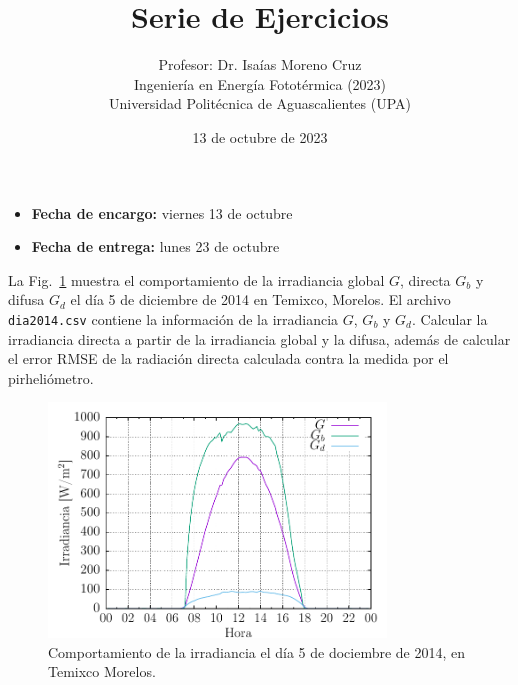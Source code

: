 \documentclass[spanish, letterpaper,12]{article}
\newenvironment{problem}[2][Problema]{\begin{trivlist}
\item[\hskip \labelsep {\bfseries #1}\hskip \labelsep {\bfseries #2.}]}{\end{trivlist}}
\begin{document}
 
\title{Serie de Ejercicios}
\author{Profesor: Dr. Isaías Moreno Cruz\\
  Ingeniería en Energía Fototérmica (2023)\\
Universidad Politécnica de Aguascalientes (UPA)}
\date{13 de octubre de 2023}

\maketitle

\begin{itemize}[leftmargin=*, noitemsep]
\item \textbf{Fecha de encargo:} viernes 13 de octubre
\item \textbf{Fecha de entrega:} lunes 23 de octubre
\end{itemize}
\thispagestyle{fancy}

\begin{problem}{1}

  La Fig.~\ref{fig:dia2014} muestra el comportamiento de la irradiancia global $G$, directa $G_{b}$ y difusa $G_{d}$ el día 5 de diciembre de 2014 en Temixco, Morelos. El archivo \verb|dia2014.csv| contiene la información de la irradiancia $G$, $G_{b}$ y $G_{d}$. Calcular la irradiancia directa a partir de la irradiancia global y la difusa, además de calcular el error RMSE de la radiación directa calculada contra la medida por el pirheliómetro.

\begin{figure}[ht]
  \centering
  \includegraphics[width=0.8\textwidth]{dia2014}
  \caption{\label{fig:dia2014} Comportamiento de la irradiancia el día 5 de dociembre de 2014, en Temixco Morelos.}
\end{figure}

\end{problem}
\end{document}
